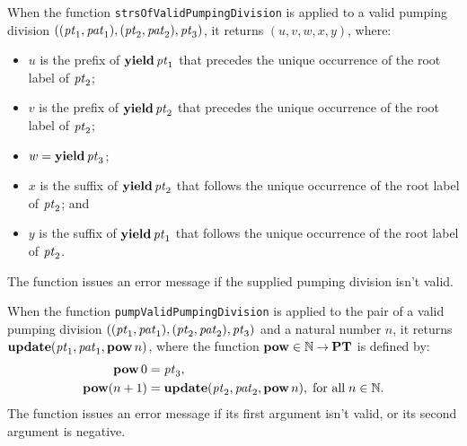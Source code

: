 When the function \texttt{strsOfValidPumpingDivision} is applied to a
valid pumping division $(({\it pt}_1, {\it pat}_1), ({\it pt}_2, {\it pat}_2), {\it pt}_3)$, it
returns $(u, v, w, x, y)$, where:
\begin{itemize}
\item $u$ is the prefix of $\mathbf{yield}\,{\it pt}_1$ that precedes the unique
  occurrence of the root label of ${\it pt}_2$;

\item $v$ is the prefix of $\mathbf{yield}\,{\it pt}_2$ that precedes the unique
  occurrence of the root label of ${\it pt}_2$;

\item $w = \mathbf{yield}\,{\it pt}_3$;

\item $x$ is the suffix of $\mathbf{yield}\,{\it pt}_2$ that follows the unique
  occurrence of the root label of ${\it pt}_2$; and

\item $y$ is the suffix of $\mathbf{yield}\,{\it pt}_1$ that follows the unique
  occurrence of the root label of ${\it pt}_2$.
\end{itemize}
The function issues an error message if the supplied pumping division
isn't valid.

When the function \texttt{pumpValidPumpingDivision} is applied to the
pair of a
valid pumping division $(({\it pt}_1, {\it pat}_1), ({\it pt}_2, {\it pat}_2), {\it pt}_3)$
and a natural number $n$,
it returns $\mathbf{update}({\it pt}_1, {\it pat}_1, \mathbf{pow}\,n)$, where the function
$\mathbf{pow}\in\mathbb{N}\mathbin{\to}\mathbf{PT}$ is defined by:
\begin{align*}
  \mathbf{pow}\,0 &= {\it pt}_3 , \\
  \mathbf{pow}(n + 1) &= \mathbf{update}({\it pt}_2, {\it pat}_2, \mathbf{pow}\,n) ,
  \;\allowbreak\mbox{for all}\allowbreak\; n\in\mathbb{N} .
\end{align*}
The function issues an error message if its first argument isn't valid,
or its second argument is negative.

